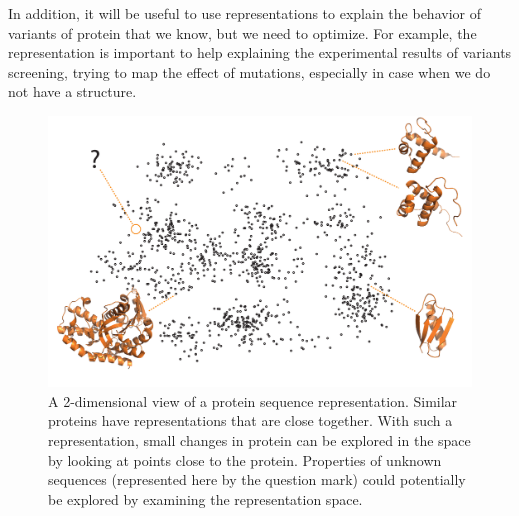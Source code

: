 In addition, it will be useful to use representations to explain the behavior of variants of protein that we know, but we need to optimize. For example, the representation is important to help explaining the experimental results of variants screening, trying to map the effect of mutations, especially in case when we do not have a structure.

\begin{figure}[ht]
    \centering
    \includegraphics[width=\textwidth]{figure.pdf}
    \caption{A 2-dimensional view of a protein sequence representation. Similar proteins have representations that are close together. With such a representation, small changes in protein can be explored in the space by looking at points close to the protein. Properties of unknown sequences (represented here by the question mark) could potentially be explored by examining the representation space.}
    \label{fig:latentSpace}
\end{figure}




